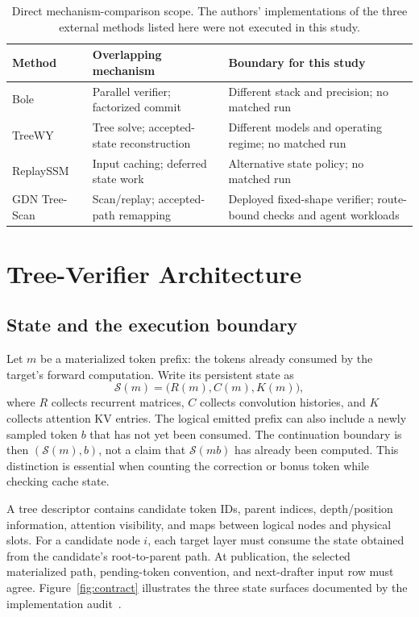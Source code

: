 \documentclass[conference]{IEEEtran}
\newcommand{\sys}{GDN Tree-Scan}
\begin{document}
\begin{table}[t]
\caption{Direct mechanism-comparison scope. The authors' implementations of the three external methods listed here were not executed in this study.}
\label{tab:related}
\centering\footnotesize
\begin{tabularx}{\columnwidth}{@{}>{\raggedright\arraybackslash}p{}YY@{}}
\toprule
Method & Overlapping mechanism & Boundary for this study \\
\midrule
Bole~\cite{wang2026bole} & Parallel verifier; factorized commit & Different stack and precision; no matched run \\
TreeWY~\cite{ghantasala2026treewy} & Tree solve; accepted-state reconstruction & Different models and operating regime; no matched run \\
ReplaySSM~\cite{replayssm2026} & Input caching; deferred state work & Alternative state policy; no matched run \\
\sys{} & Scan/replay; accepted-path remapping & Deployed fixed-shape verifier; route-bound checks and agent workloads \\
\bottomrule
\end{tabularx}
\end{table}

\section{Tree-Verifier Architecture}
\label{sec:contract}
\subsection{State and the execution boundary}
Let $m$ be a materialized token prefix: the tokens already consumed by the target's forward computation. Write its persistent state as
\begin{equation}
\mathcal{S}(m)=\bigl(R(m),C(m),K(m)\bigr),
\end{equation}
where $R$ collects recurrent matrices, $C$ collects convolution histories, and $K$ collects attention KV entries. The logical emitted prefix can also include a newly sampled token $b$ that has not yet been consumed. The continuation boundary is then $(\mathcal{S}(m),b)$, not a claim that $\mathcal{S}(mb)$ has already been computed. This distinction is essential when counting the correction or bonus token while checking cache state.

A tree descriptor contains candidate token IDs, parent indices, depth/position information, attention visibility, and maps between logical nodes and physical slots. For a candidate node $i$, each target layer must consume the state obtained from the candidate's root-to-parent path. At publication, the selected materialized path, pending-token convention, and next-drafter input row must agree. Figure~\ref{fig:contract} illustrates the three state surfaces documented by the implementation audit~\cite{lumo2026stateless,lumo2026archive}.
\end{document}
